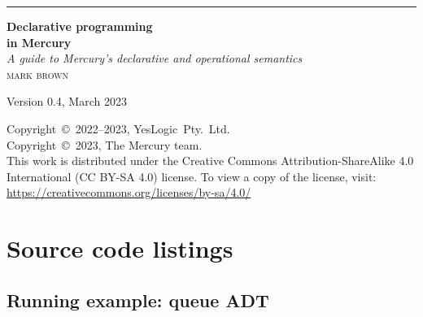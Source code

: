 \documentclass[a4paper,11pt]{book}
\begin{document}
\frontmatter

\begin{titlepage}
\raggedleft
\rule{1pt}{\textheight}
\hspace{0.05\textwidth}
\parbox[b]{0.8\textwidth}{
{\Huge\bfseries Declarative programming \\[0.5\baselineskip] in Mercury}
\\[2\baselineskip]
{\large\textit{A guide to Mercury's declarative and operational semantics}}
\\[4\baselineskip]
{\Large\textsc{mark brown}} %

\vspace{0.5\textheight} %

{Version 0.4, March 2023}
}
\end{titlepage}

\vspace*{\fill}

\noindent
Copyright~\copyright~2022--2023, YesLogic~Pty.~Ltd.\\
Copyright~\copyright~2023, The Mercury team. \\[0.5\baselineskip]
This work is distributed under the Creative Commons
Attribution-ShareAlike 4.0 International (CC BY-SA 4.0) license.
To view a copy of the license, visit:\\
\href{https://creativecommons.org/licenses/by-sa/4.0/}{https://creativecommons.org/licenses/by-sa/4.0/}

\tableofcontents



\mainmatter









\appendix



\chapter{Source code listings}
\label{sec:listings}

\section{Running example: queue ADT}
\label{sec:listing-queue}

\end{document}
